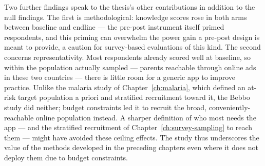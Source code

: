 Two further findings speak to the thesis's other contributions in addition to the null findings. The first is methodological: knowledge scores rose in both arms between baseline and endline \citep{Stantcheva2023} --- the pre-post instrument itself primed respondents, and this priming can overwhelm the power gain a pre-post design is meant to provide, a caution for survey-based evaluations of this kind. The second concerns representativity. Most respondents already scored well at baseline, so within the population actually sampled --- parents reachable through online ads in these two countries --- there is little room for a generic app to improve practice. Unlike the malaria study of Chapter~\ref{ch:malaria}, which defined an at-risk target population a priori and stratified recruitment toward it, the Bebbo study did neither; budget constraints led it to recruit the broad, conveniently-reachable online population instead. A sharper definition of who most needs the app --- and the stratified recruitment of Chapter~\ref{ch:survey-sampling} to reach them --- might have avoided these ceiling effects. The study thus underscores the value of the methods developed in the preceding chapters even where it does not deploy them due to budget constraints. 



\printbibliography[heading=subbibliography, title={References for Chapter \thechapter}]
